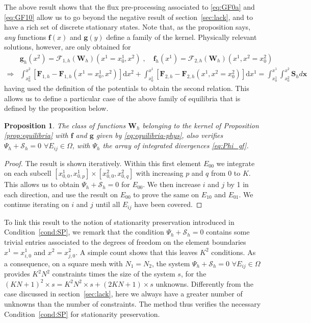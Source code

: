 \documentclass[a4paper,10pt]{article}
\newtheorem{proposition}[theorem]{Proposition}
\begin{document}
The above result shows that the flux pre-processing associated to  \eqref{eq:GF0a} and \eqref{eq:GF10} allow us to go beyond the negative result of section~\ref{sec:lack}, and to have a rich set of discrete stationary states.   Note that, as the proposition says, \emph{any}  functions   $\mathbf{f}(x)$ and $\mathbf{g}(y)$ define a family of the kernel.
Physically relevant solutions, however, are only obtained for
 \begin{equation}\label{eq:equilibria-phys}
 \begin{aligned}
 &\mathbf{g}_h(x^2) =  \mathcal{F}_{1,h}(\mathbf{W}_h)(x^1 =x^1_0,x^2)\;, \quad   \mathbf{f}_h(x^1) =\mathcal{F}_{2,h}(\mathbf{W}_h)(x^1, x^2 =x^2_0)\\
\Rightarrow & \int_{x^2_0}^{x^2}[\mathbf{F}_{1,h}-\mathbf{F}_{1,h}(x^1 =x^1_0,x^2) ] \mathrm{d}x^2 + \int_{x^1_0}^{x^1}[\mathbf{F}_{2,h}-\mathbf{F}_{2,h}(x^1,x^2=x^2_0) ] \mathrm{d}x^1=
 \int_{x^1_0}^{x^1} \int_{x^2_0}^{x^2}\mathbf{S}_hd\mathbf{x}
\end{aligned}
 \end{equation} 
having used the definition of the potentials to obtain the second relation.
This allows us to define a  particular case of the above family of equilibria that is defined by the proposition below.  
\begin{proposition}\label{prop:equilibria_local}
The class of functions $\mathbf{W}_h$ belonging to the kernel of Proposition \ref{prop:equilibria} 
with $\mathbf f$ and $\mathbf g$ given by \eqref{eq:equilibria-phys}, also verifies    $\Psi_h+\mathcal{S}_h=0$  $\forall E_{ij}\in \Omega$,
with $\Psi_h$  the  array of integrated divergences  \eqref{eq:Phi_gf}.
\end{proposition}
\begin{proof}
 The result is shown iteratively. 
 Within this first element $E_{00}$ we integrate on each subcell $[x^1_{0,0},x^1_{0,p}]\times [x^2_{0,0},x^2_{0,q}]$ with increasing $p$ and $q$ from $0$ to $K$.
 This allows us to obtain $\Psi_h+\mathcal{S}_h=0$  for $E_{00}$. We then  increase $i$ and $j$ by 1 in each direction, and use
 the result on $E_{00}$ to prove the same on $E_{10}$ and $E_{01}$. We continue iterating on $i$ and $j$ until all $E_{ij}$ have been covered.
\end{proof}
To link this result to the notion of stationarity preservation introduced in Condition~\ref{cond:SP}, we remark that the condition   $\Psi_h+\mathcal{S}_h=0$  
contains some trivial entries associated to the degrees of freedom on the element boundaries $x^1=x^1_{i,0}$ and $x^2=x^2_{j,0}$. A simple count shows that
this leaves $K^2$ conditions. As a consequence,  on a square mesh with $N_1 = N_2$, 
the system $\Psi_h+\mathcal{S}_h=0$   $\forall E_{ij}\in \Omega$ provides $K^2N^2$ constraints times the size of the system $s$, 
for  the $(KN+1)^2\times s = K^2N^2\times s + ( 2KN+1 )\times s$ unknowns. Differently from the case discussed in section~\ref{sec:lack}, here we always have 
a greater number of unknowns than the number of constraints. The method thus verifies  the necessary Condition~\ref{cond:SP} for stationarity preservation.
 
\end{document}

